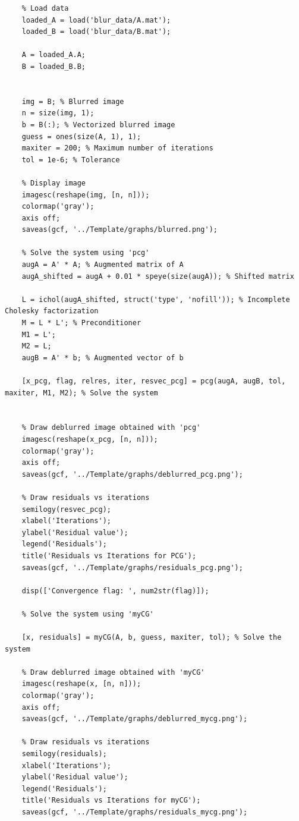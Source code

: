 \documentclass[unicode,11pt,a4paper,oneside,numbers=endperiod,openany]{scrartcl}
\begin{document}
\begin{lstlisting}[style=matlab, caption={Matlab code for solving the deblurring problem}, label={lst:deblurring}]
    %% Excercise 4.1
    % Load data
    loaded_A = load('blur_data/A.mat');
    loaded_B = load('blur_data/B.mat');

    A = loaded_A.A;
    B = loaded_B.B;


    img = B; % Blurred image
    n = size(img, 1);
    b = B(:); % Vectorized blurred image
    guess = ones(size(A, 1), 1);
    maxiter = 200; % Maximum number of iterations
    tol = 1e-6; % Tolerance

    % Display image
    imagesc(reshape(img, [n, n]));
    colormap('gray');
    axis off;
    saveas(gcf, '../Template/graphs/blurred.png');

    % Solve the system using 'pcg'
    augA = A' * A; % Augmented matrix of A
    augA_shifted = augA + 0.01 * speye(size(augA)); % Shifted matrix

    L = ichol(augA_shifted, struct('type', 'nofill')); % Incomplete Cholesky factorization
    M = L * L'; % Preconditioner
    M1 = L';
    M2 = L;
    augB = A' * b; % Augmented vector of b

    [x_pcg, flag, relres, iter, resvec_pcg] = pcg(augA, augB, tol, maxiter, M1, M2); % Solve the system


    % Draw deblurred image obtained with 'pcg'
    imagesc(reshape(x_pcg, [n, n]));
    colormap('gray');
    axis off;
    saveas(gcf, '../Template/graphs/deblurred_pcg.png');

    % Draw residuals vs iterations
    semilogy(resvec_pcg);
    xlabel('Iterations');
    ylabel('Residual value');
    legend('Residuals');
    title('Residuals vs Iterations for PCG');
    saveas(gcf, '../Template/graphs/residuals_pcg.png');

    disp(['Convergence flag: ', num2str(flag)]);

    % Solve the system using 'myCG'

    [x, residuals] = myCG(A, b, guess, maxiter, tol); % Solve the system

    % Draw deblurred image obtained with 'myCG'
    imagesc(reshape(x, [n, n]));
    colormap('gray');
    axis off;
    saveas(gcf, '../Template/graphs/deblurred_mycg.png');

    % Draw residuals vs iterations
    semilogy(residuals);
    xlabel('Iterations');
    ylabel('Residual value');
    legend('Residuals');
    title('Residuals vs Iterations for myCG');
    saveas(gcf, '../Template/graphs/residuals_mycg.png');
\end{lstlisting}
\end{document}
